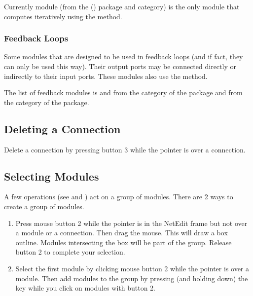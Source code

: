 Currently module  (from the \package(\sr) package and
 category) is the only module that computes iteratively
using the  method.

\subsubsection{Feedback Loops}

Some modules that are designed to be used in feedback loops (and if fact,
they can only be used this way).  Their output ports may be connected
directly or indirectly to their input ports.  These modules also use the
 method.

The list of feedback modules is  and
 from the  category of the
 package and  from the
 category of the  package.

\subsection{Deleting a Connection}
\label{sec:deleteconnections}

Delete a connection by pressing button 3 while the pointer is
over a connection.

\subsection{Selecting Modules}
\label{sec:selectmods}

A few operations (see  and
) act on a group of
modules.  There are 2 ways to create a group of modules.

\begin{enumerate}
\item Press mouse button 2 while the pointer is in the NetEdit frame but not over
a module or a connection.  Then drag the mouse.  This will draw a box
outline.  Modules intersecting the box will be part of the group.  Release
button 2 to complete your selection.
\item Select the first module by clicking mouse button 2 while the pointer is
over a module.  Then add modules to the group by pressing (and holding
down) the  key while you click on modules with button 2.
\end{enumerate}

